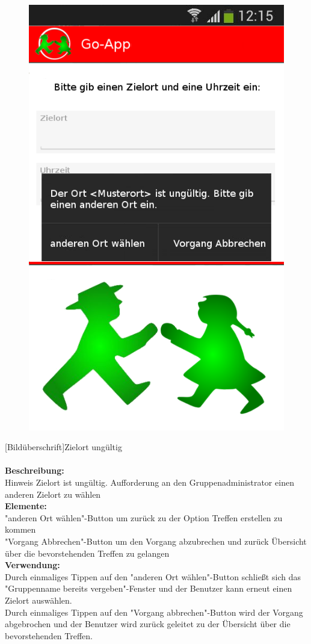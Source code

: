 \begin{figure}
	\includegraphics[scale =1]{resources/images/treffpunkt_erstellen_ungueltig_Ort.png}
\end{figure}
[Bildüberschrift]Zielort ungültig\\ \\
\textbf{Beschreibung:}\\
Hinweis Zielort ist ungültig. Aufforderung an den Gruppenadministrator einen anderen Zielort zu wählen\\
\textbf{Elemente:}\\
"anderen Ort wählen"-Button um zurück zu der Option Treffen erstellen zu kommen\\
"Vorgang Abbrechen"-Button um den Vorgang abzubrechen und zurück Übersicht über die bevorstehenden Treffen zu gelangen\\
\textbf{Verwendung:}\\
Durch einmaliges Tippen auf den "anderen Ort wählen"-Button schließt sich das "Gruppenname bereits vergeben"-Fenster und der Benutzer kann erneut einen Zielort auswählen.\\
Durch einmaliges Tippen auf den "Vorgang abbrechen"-Button wird der Vorgang abgebrochen und der Benutzer wird zurück geleitet zu der Übersicht über die bevorstehenden Treffen.\\ \\

